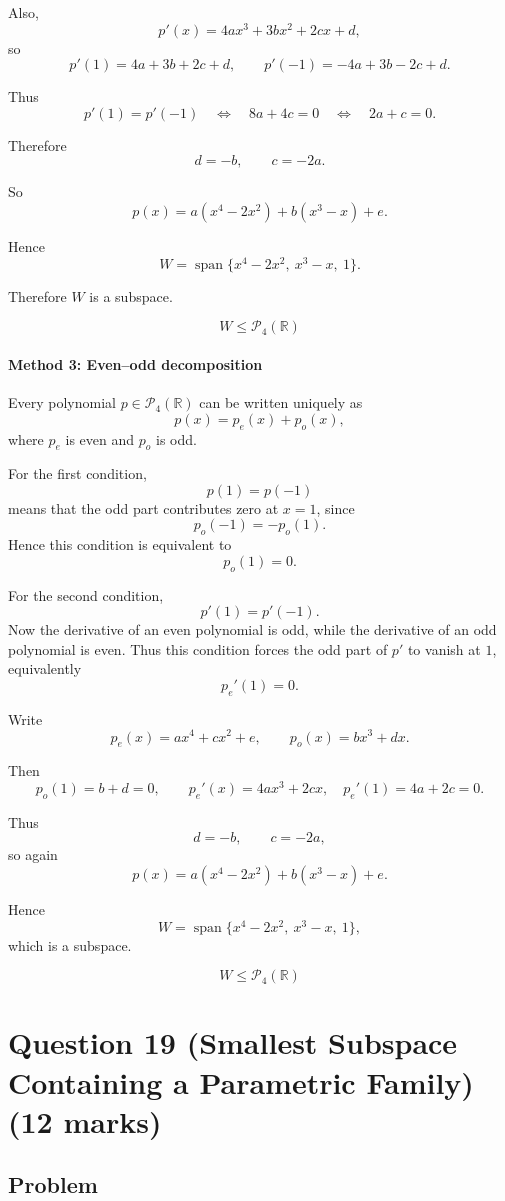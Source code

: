 \documentclass[12pt]{article}
\newcommand{\Span}{\operatorname{span}}
\begin{document}
Also,
\[
p'(x)=4ax^3+3bx^2+2cx+d,
\]
so
\[
p'(1)=4a+3b+2c+d,
\qquad
p'(-1)=-4a+3b-2c+d.
\]

Thus
\[
p'(1)=p'(-1)
\quad\Longleftrightarrow\quad
8a+4c=0
\quad\Longleftrightarrow\quad
2a+c=0.
\]

Therefore
\[
d=-b,\qquad c=-2a.
\]

So
\[
p(x)=a(x^4-2x^2)+b(x^3-x)+e.
\]

Hence
\[
W=\Span\{x^4-2x^2,\ x^3-x,\ 1\}.
\]

Therefore \(W\) is a subspace.

\[
\boxed{W\le \mathcal P_4(\mathbb R)}
\]

\paragraph{Method 3: Even--odd decomposition}

Every polynomial \(p\in\mathcal P_4(\mathbb R)\) can be written uniquely as
\[
p(x)=p_e(x)+p_o(x),
\]
where \(p_e\) is even and \(p_o\) is odd.

For the first condition,
\[
p(1)=p(-1)
\]
means that the odd part contributes zero at \(x=1\), since
\[
p_o(-1)=-p_o(1).
\]
Hence this condition is equivalent to
\[
p_o(1)=0.
\]

For the second condition,
\[
p'(1)=p'(-1).
\]
Now the derivative of an even polynomial is odd, while the derivative of an odd polynomial is even. Thus this condition forces the odd part of \(p'\) to vanish at \(1\), equivalently
\[
p_e'(1)=0.
\]

Write
\[
p_e(x)=ax^4+cx^2+e,
\qquad
p_o(x)=bx^3+dx.
\]

Then
\[
p_o(1)=b+d=0,
\qquad
p_e'(x)=4ax^3+2cx,
\quad
p_e'(1)=4a+2c=0.
\]

Thus
\[
d=-b,\qquad c=-2a,
\]
so again
\[
p(x)=a(x^4-2x^2)+b(x^3-x)+e.
\]

Hence
\[
W=\Span\{x^4-2x^2,\ x^3-x,\ 1\},
\]
which is a subspace.

\[
\boxed{W\le \mathcal P_4(\mathbb R)}
\]

\newpage
\section{Question 19 (Smallest Subspace Containing a Parametric Family) \hfill (12 marks)}
\subsection{Problem}
\end{document}
